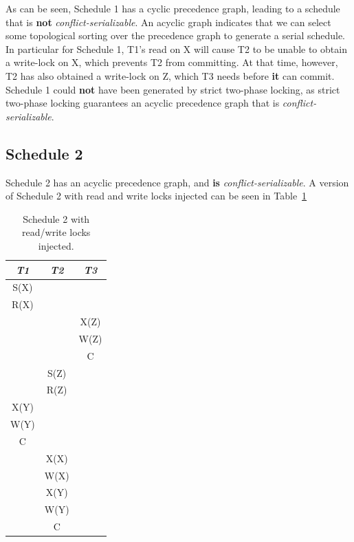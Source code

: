 As can be seen, Schedule 1 has a cyclic precedence graph, leading to a schedule that is
\textbf{not} \textit{conflict-serializable}. An acyclic graph indicates that we
can select some topological sorting over the precedence graph to generate a
serial schedule. In particular for Schedule 1, T1's read on X will cause T2 to
be unable to obtain a write-lock on X, which prevents T2 from committing. At
that time, however, T2 has also obtained a write-lock on Z, which T3 needs
before \textbf{it} can commit. Schedule 1 could \textbf{not} have been generated
by strict two-phase locking, as strict two-phase locking guarantees an acyclic
precedence graph that is \textit{conflict-serializable}.

\subsection{Schedule 2}
Schedule 2 has an acyclic precedence graph, and \textbf{is}
\textit{conflict-serializable}. A version of Schedule 2 with read and write
locks injected can be seen in Table~\ref{tbl:sched2}

\begin{table}[!htb]
    \begin{tabular}{c|c|c}
        \textit{T1} & \textit{T2} & \textit{T3} \\ \hline
        S(X) & & \\
        R(X) & & \\
        & & X(Z) \\
        & & W(Z) \\
        & & C \\
        & S(Z) & \\
        & R(Z) & \\
        X(Y) & & \\
        W(Y) & & \\
        C & & \\
        & X(X) & \\
        & W(X) & \\
        & X(Y) & \\
        & W(Y) & \\
        & C & 
    \end{tabular}
    \caption{Schedule 2 with read/write locks injected.\label{tbl:sched2}}
\end{table}

